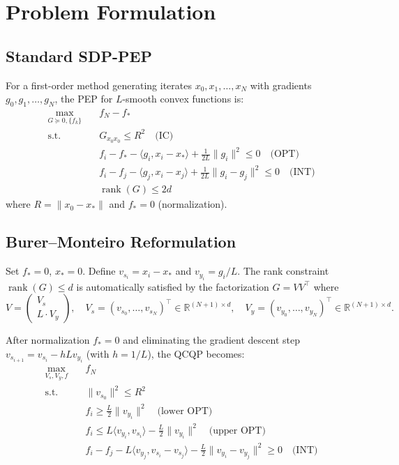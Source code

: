 \documentclass[11pt]{article}
\newcommand{\R}{\mathbb{R}}
\begin{document}
\section{Problem Formulation}

\subsection{Standard SDP-PEP}

For a first-order method generating iterates $x_0, x_1, \ldots, x_N$ with gradients $g_0, g_1, \ldots, g_N$, the PEP for $L$-smooth convex functions is:
\begin{align}
\max_{G \succeq 0, \{f_k\}} \quad & f_N - f_* \label{eq:obj}\\
\text{s.t.} \quad & G_{x_0 x_0} \leq R^2 \quad \text{(IC)} \label{eq:ic}\\
& f_i - f_* - \langle g_i, x_i - x_*\rangle + \frac{1}{2L}\|g_i\|^2 \leq 0 \quad \text{(OPT)} \label{eq:opt}\\
& f_i - f_j - \langle g_j, x_i - x_j\rangle + \frac{1}{2L}\|g_i - g_j\|^2 \leq 0 \quad \text{(INT)} \label{eq:int}\\
& \operatorname{rank}(G) \leq 2d \label{eq:rank}
\end{align}
where $R = \|x_0 - x_*\|$ and $f_* = 0$ (normalization).

\subsection{Burer--Monteiro Reformulation}

Set $f_* = 0$, $x_* = 0$. Define $v_{s_i} = x_i - x_*$ and $v_{y_i} = g_i / L$.
The rank constraint $\operatorname{rank}(G) \leq d$ is automatically satisfied by the factorization $G = VV^\top$ where
\[
V = \begin{pmatrix} V_s \\ L \cdot V_y \end{pmatrix}, \quad V_s = (v_{s_0}, \ldots, v_{s_N})^\top \in \R^{(N+1)\times d}, \quad V_y = (v_{y_0}, \ldots, v_{y_N})^\top \in \R^{(N+1)\times d}.
\]

After normalization $f_* = 0$ and eliminating the gradient descent step $v_{s_{i+1}} = v_{s_i} - h L v_{y_i}$ (with $h = 1/L$), the QCQP becomes:
\begin{align}
\max_{V_s, V_y, f} \quad & f_N \label{eq:bm_obj}\\
\text{s.t.} \quad & \|v_{s_0}\|^2 \leq R^2 \label{eq:bm_ic}\\
& f_i \geq \frac{L}{2}\|v_{y_i}\|^2 \quad \text{(lower OPT)} \label{eq:bm_lopt}\\
& f_i \leq L\langle v_{y_i}, v_{s_i}\rangle - \frac{L}{2}\|v_{y_i}\|^2 \quad \text{(upper OPT)} \label{eq:bm_uopt}\\
& f_i - f_j - L\langle v_{y_j}, v_{s_i} - v_{s_j}\rangle - \frac{L}{2}\|v_{y_i} - v_{y_j}\|^2 \geq 0 \quad \text{(INT)} \label{eq:bm_int}
\end{align}
\end{document}
